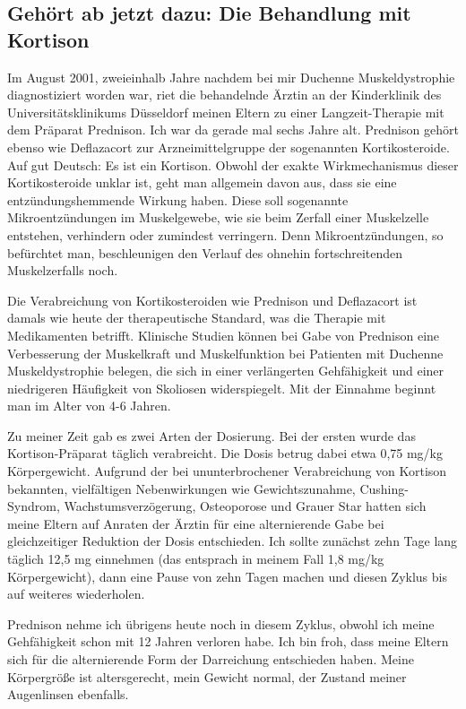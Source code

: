 \documentclass[fontsize=14pt,a4paper,headinclude,DIV=calc,automark]{scrbook}
\begin{document}
\subsection{Gehört ab jetzt dazu: Die Behandlung mit Kortison}

Im August 2001, zweieinhalb Jahre nachdem bei mir Duchenne Muskeldystrophie diagnostiziert worden war, riet die behandelnde Ärztin an der Kinderklinik des Universitätsklinikums Düsseldorf meinen Eltern zu einer Langzeit-Therapie mit dem Präparat Prednison. Ich war da gerade mal sechs Jahre alt. Prednison gehört ebenso wie Deflazacort zur Arzneimittelgruppe der sogenannten Kortikosteroide. Auf gut Deutsch: Es ist ein Kortison. Obwohl der exakte Wirkmechanismus dieser Kortikosteroide unklar ist, geht man allgemein davon aus, dass sie eine entzündungshemmende Wirkung haben. Diese soll sogenannte Mikroentzündungen im Muskelgewebe, wie sie beim Zerfall einer Muskelzelle entstehen, verhindern oder zumindest verringern. Denn Mikroentzündungen, so befürchtet man, beschleunigen den Verlauf des ohnehin fortschreitenden Muskelzerfalls noch.

Die Verabreichung von Kortikosteroiden wie Prednison und Deflazacort ist damals wie heute der therapeutische Standard, was die Therapie mit Medikamenten betrifft. Klinische Studien können bei Gabe von Prednison eine Verbesserung der Muskelkraft und Muskelfunktion bei Patienten mit Duchenne Muskeldystrophie belegen, die sich in einer verlängerten Gehfähigkeit und einer niedrigeren Häufigkeit von Skoliosen widerspiegelt. Mit der Einnahme beginnt man im Alter von 4-6 Jahren.

Zu meiner Zeit gab es zwei Arten der Dosierung. Bei der ersten wurde das Kortison-Präparat täglich verabreicht. Die Dosis betrug dabei etwa 0,75 mg/kg Körpergewicht. Aufgrund der bei ununterbrochener Verabreichung von Kortison bekannten, vielfältigen Nebenwirkungen wie Gewichtszunahme, Cushing-Syndrom, Wachstumsverzögerung, Osteoporose und Grauer Star hatten sich meine Eltern auf Anraten der Ärztin für eine alternierende Gabe bei gleichzeitiger Reduktion der Dosis entschieden. Ich sollte zunächst zehn Tage lang täglich 12,5 mg einnehmen (das entsprach in meinem Fall 1,8 mg/kg Körpergewicht), dann eine Pause von zehn Tagen machen und diesen Zyklus bis auf weiteres wiederholen.

Prednison nehme ich übrigens heute noch in diesem Zyklus, obwohl ich meine Gehfähigkeit schon mit 12 Jahren verloren habe. Ich bin froh, dass meine Eltern sich für die alternierende Form der Darreichung entschieden haben. Meine Körpergröße ist altersgerecht, mein Gewicht normal, der Zustand meiner Augenlinsen ebenfalls.
\end{document}
